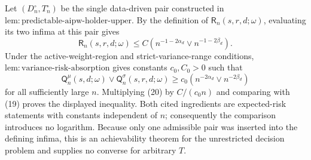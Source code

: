 Let \((D_n^{\circ},T_n^{\circ})\) be the single data-driven pair constructed in \(\mathrm{lem{:}predictable\text{-}aipw\text{-}holder\text{-}upper}\).  By the definition of \(\mathsf R_n(s,r,d;\omega)\), evaluating its two infima at this pair gives
\[
\mathsf R_n(s,r,d;\omega)
\leq C\left(n^{-1-2\alpha_d}\vee n^{-1-2\beta_d}\right).
\tag{19}
\]
Under the active-weight-region and strict-variance-range conditions, \(\mathrm{lem{:}variance\text{-}risk\text{-}absorption}\) gives constants \(c_0,C_0>0\) such that
\[
\mathsf Q_n^{\mu}(s,d;\omega)\vee
\mathsf Q_n^{\sigma}(s,r,d;\omega)
\geq c_0\left(n^{-2\alpha_d}\vee n^{-2\beta_d}\right)
\tag{20}
\]
for all sufficiently large \(n\).  Multiplying (20) by \(C/(c_0n)\) and comparing with (19) proves the displayed inequality.  Both cited ingredients are expected-risk statements with constants independent of \(n\); consequently the comparison introduces no logarithm.  Because only one admissible pair was inserted into the defining infima, this is an achievability theorem for the unrestricted decision problem and supplies no converse for arbitrary \(T\).
